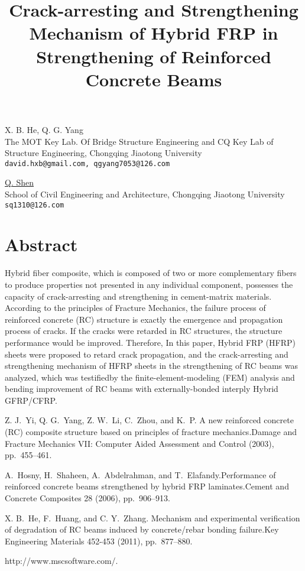 \title{Crack-arresting and Strengthening Mechanism of Hybrid FRP in Strengthening of Reinforced Concrete Beams}
\author{} \institute{}
\maketitle

\begin{center}
{\large X. B. He, Q. G. Yang}\\
The MOT Key Lab. Of Bridge Structure Engineering and CQ Key Lab of Structure Engineering, Chongqing Jiaotong University\\
{\tt david.hxb@gmail.com, qgyang7053@126.com}\\
\vspace{4mm}

{\large \underline{Q. Shen}}\\
School of Civil Engineering and Architecture, Chongqing Jiaotong University\\
{\tt sq1310@126.com}
\end{center}

\section*{Abstract}
Hybrid fiber composite, which is composed of two or more complementary fibers to produce properties not presented in any individual component, possesses the capacity of crack-arresting and strengthening in cement-matrix materials. According to the principles of Fracture Mechanics, the failure process of reinforced concrete (RC) structure is exactly the emergence and propagation process of cracks. If the cracks were retarded in RC structures, the structure performance would be improved. Therefore, In this paper, Hybrid FRP (HFRP) sheets were proposed to retard crack propagation, and the crack-arresting and strengthening mechanism of HFRP sheets in the strengthening of RC beams was analyzed, which was testifiedby the finite-element-modeling (FEM) analysis and bending improvement of RC beams with externally-bonded interply Hybrid GFRP/CFRP.


\begin{thebibliography}{10}
{\sc Z. J.~Yi, Q. G.~Yang, Z. W.~Li, C.~Zhou, and K.~P}. {A new reinforced concrete (RC) composite structure based on principles of fracture mechanics}.Damage and Fracture Mechanics VII: Computer Aided Assessment and Control (2003), pp.~455--461.

{\sc A.~Hosny, H.~Shaheen, A.~Abdelrahman, and T.~Elafandy}.{Performance of reinforced concrete beams strengthened by hybrid FRP laminates}.Cement and Concrete Composites 28 (2006), pp.~906--913.

{\sc X. B.~He, F.~Huang, and C. Y.~Zhang}. {Mechanism and experimental verification of degradation of RC beams induced by concrete/rebar bonding failure}.Key Engineering Materials 452-453 (2011), pp.~877--880.

\bibitem{}
\newblock http://www.mscsoftware.com/.
\end{thebibliography}